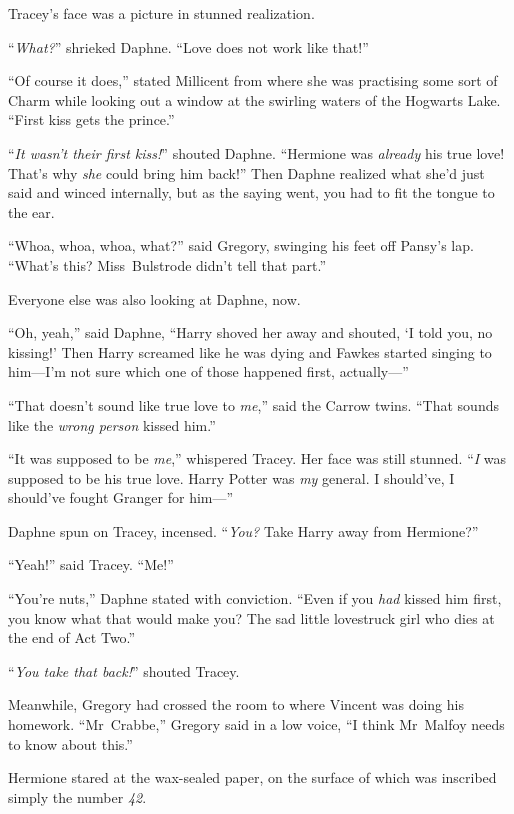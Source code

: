 Tracey’s face was a picture in stunned realization.

“\emph{What?}” shrieked Daphne.
“Love does not work like that!”

“Of course it does,” stated Millicent from where she was practising some sort of Charm while looking out a window at the swirling waters of the Hogwarts Lake.
“First kiss gets the prince.”

“\emph{It wasn’t their first kiss!}” shouted Daphne.
“Hermione was \emph{already} his true love! That’s why \emph{she} could bring him back!” Then Daphne realized what she’d just said and winced internally, but as the saying went, you had to fit the tongue to the ear.

“Whoa, whoa, whoa, what?” said Gregory, swinging his feet off Pansy’s lap.
“What’s this? Miss~Bulstrode didn’t tell that part.”

Everyone else was also looking at Daphne, now.

“Oh, yeah,” said Daphne,
“Harry shoved her away and shouted, ‘I told you, no kissing!’ Then Harry screamed like he was dying and Fawkes started singing to him—I’m not sure which one of those happened first, actually—”

“That doesn’t sound like true love to \emph{me},” said the Carrow twins.
“That sounds like the \emph{wrong person} kissed him.”

“It was supposed to be \emph{me},” whispered Tracey. Her face was still stunned. “\emph{I} was supposed to be his true love. Harry Potter was \emph{my} general. I should’ve, I should’ve fought Granger for him—”

Daphne spun on Tracey, incensed. “\emph{You?} Take Harry away from Hermione?”

“Yeah!” said Tracey.
“Me!”

“You’re nuts,” Daphne stated with conviction.
“Even if you \emph{had} kissed him first, you know what that would make you? The sad little lovestruck girl who dies at the end of Act Two.”

“\emph{You take that back!}” shouted Tracey.

Meanwhile, Gregory had crossed the room to where Vincent was doing his homework.
“Mr~Crabbe,” Gregory said in a low voice,
“I think Mr~Malfoy needs to know about this.”


Hermione stared at the wax-sealed paper, on the surface of which was inscribed simply the number \emph{42}.

